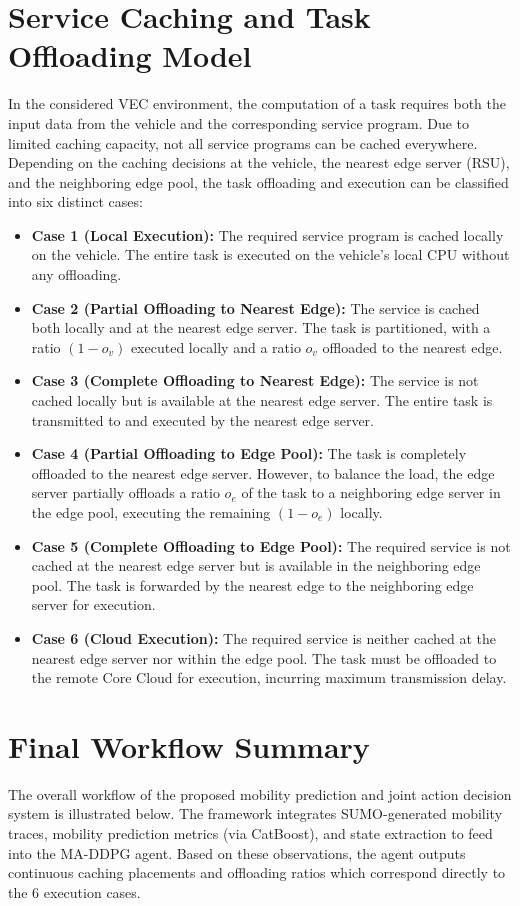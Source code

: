\documentclass[12pt,a4paper]{report}
\begin{document}
\section{Service Caching and Task Offloading Model}
In the considered VEC environment, the computation of a task requires both the input data from the vehicle and the corresponding service program. Due to limited caching capacity, not all service programs can be cached everywhere. Depending on the caching decisions at the vehicle, the nearest edge server (RSU), and the neighboring edge pool, the task offloading and execution can be classified into six distinct cases:
\begin{itemize}
    \item \textbf{Case 1 (Local Execution):} The required service program is cached locally on the vehicle. The entire task is executed on the vehicle's local CPU without any offloading.
    \item \textbf{Case 2 (Partial Offloading to Nearest Edge):} The service is cached both locally and at the nearest edge server. The task is partitioned, with a ratio $(1-o_v)$ executed locally and a ratio $o_v$ offloaded to the nearest edge.
    \item \textbf{Case 3 (Complete Offloading to Nearest Edge):} The service is not cached locally but is available at the nearest edge server. The entire task is transmitted to and executed by the nearest edge server.
    \item \textbf{Case 4 (Partial Offloading to Edge Pool):} The task is completely offloaded to the nearest edge server. However, to balance the load, the edge server partially offloads a ratio $o_e$ of the task to a neighboring edge server in the edge pool, executing the remaining $(1-o_e)$ locally.
    \item \textbf{Case 5 (Complete Offloading to Edge Pool):} The required service is not cached at the nearest edge server but is available in the neighboring edge pool. The task is forwarded by the nearest edge to the neighboring edge server for execution.
    \item \textbf{Case 6 (Cloud Execution):} The required service is neither cached at the nearest edge server nor within the edge pool. The task must be offloaded to the remote Core Cloud for execution, incurring maximum transmission delay.
\end{itemize}

\section{Final Workflow Summary}
The overall workflow of the proposed mobility prediction and joint action decision system is illustrated below. The framework integrates SUMO-generated mobility traces, mobility prediction metrics (via CatBoost), and state extraction to feed into the MA-DDPG agent. Based on these observations, the agent outputs continuous caching placements and offloading ratios which correspond directly to the 6 execution cases.
\end{document}
